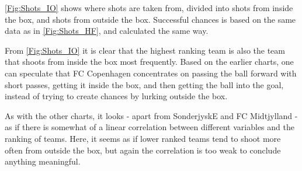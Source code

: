 \documentclass[Report.tex]{subfiles}
\begin{document}
\ref{Fig:Shots_IO} shows where shots are taken from, divided into shots from inside the
box, and shots from outside the box. Successful chances is based on the same
data as in \ref{Fig:Shots_HF}, and calculated the same way. 

From \ref{Fig:Shots_IO} it is clear that the highest ranking team is also the team that
shoots from inside the box most frequently. Based on the earlier charts, one can
speculate that FC Copenhagen concentrates on passing the ball forward with short
passes, getting it inside the box, and then getting the ball into the goal,
instead of trying to create chances by lurking outside the box. 

As with the other charts, it looks - apart from SonderjyskE and FC Midtjylland -
as if there is somewhat of a linear correlation between different variables and
the ranking of teams. Here, it seems as if lower ranked teams tend to shoot more
often from outside the box, but again the correlation is too weak to conclude
anything meaningful. 

	
\end{document}
